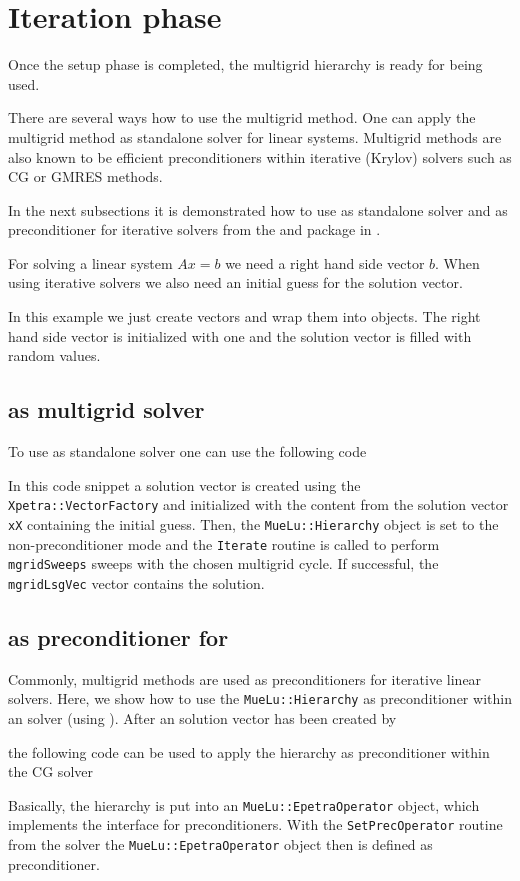\documentclass[10pt,fleqn]{book}
\providecommand\printCppListing[1]{

}
\begin{document}
\section{Iteration phase}
\label{sec:iterationphase}
Once the setup phase is completed, the \muelu multigrid hierarchy is ready for being used.

There are several ways how to use the multigrid method. One can apply the multigrid method as standalone solver for linear systems. Multigrid methods are also known to be efficient preconditioners within iterative (Krylov) solvers such as CG or GMRES methods.

In the next subsections it is demonstrated how to use \muelu as standalone solver and as preconditioner for iterative solvers from the \belos and \aztecoo package in \trilinos.

For solving a linear system $Ax=b$ we need a right hand side vector $b$. When using iterative solvers we also need an initial guess for the solution vector.
\printCppListing{laplace2d.cpp_7.fragment}
In this example we just create \epetra vectors and wrap them into \xpetra objects. The right hand side vector is initialized with one and the solution vector is filled with random values.

\subsection{\muelu as multigrid solver}
To use \muelu as standalone solver one can use the following code
\printCppListing{laplace2d.cpp_18.fragment}
In this code snippet a solution vector is created using the \texttt{Xpetra::VectorFactory} and initialized with the content from the solution vector \verb|xX| containing the initial guess. Then, the \texttt{MueLu::Hierarchy} object is set to the non-preconditioner mode and the \texttt{Iterate} routine is called
to perform \texttt{mgridSweeps} sweeps with the chosen multigrid cycle. If successful, the \texttt{mgridLsgVec} vector contains the solution.

\subsection{\muelu as preconditioner for \aztecoo}
Commonly, multigrid methods are used as preconditioners for iterative linear solvers. Here, we show how to use the \texttt{MueLu::Hierarchy} as preconditioner within an \aztecoo solver (using \epetra).
After an \epetra solution vector has been created by

the following code can be used to apply the \muelu hierarchy as preconditioner within the \aztecoo CG solver

Basically, the \muelu hierarchy is put into an \texttt{MueLu::EpetraOperator} object, which implements the \epetra interface for preconditioners.
With the \texttt{SetPrecOperator} routine from the \aztecoo solver the \texttt{MueLu::EpetraOperator} object then is defined as preconditioner.
\end{document}
